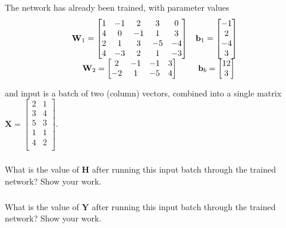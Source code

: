 \documentclass[12pt,a4paper]{article}
\begin{document}
The network has already been trained, with parameter values
\[
\begin{array}{c c}
\mathbf{W}_1 = 
\begin{bmatrix}
1 & -1 & 2 & 3 & 0 \\
4 & 0 & -1 & 1 & 3 \\
2 & 1 & 3 & -5 & -4 \\
4 & -3 & 2 & 1 & -3 \\
\end{bmatrix}
&
\mathbf{b}_1 = 
\begin{bmatrix}
-1 \\
2 \\
-4 \\
3 \\
\end{bmatrix} \\
\mathbf{W}_2 = 
\begin{bmatrix}
2 & -1 & -1 & 3 \\
-2 & 1 & -5 & 4 \\
\end{bmatrix}
&
\mathbf{b}_b = 
\begin{bmatrix}
12 \\
3 \\
\end{bmatrix} \\
\end{array}
\]

and input is a batch of two (column) vectors, combined into a single matrix $\mathbf{X} = 
\begin{bmatrix}
2 & 1 \\
3 & 4 \\
5 & 3 \\
1 & 1 \\
4 & 2 \\
\end{bmatrix}$.

\subsubsection{}

What is the value of $\mathbf{H}$ after running this input batch through the trained network? Show your work.

\subsubsection{}

What is the value of $\mathbf{Y}$ after running this input batch through the trained network? Show your work.
\end{document}
